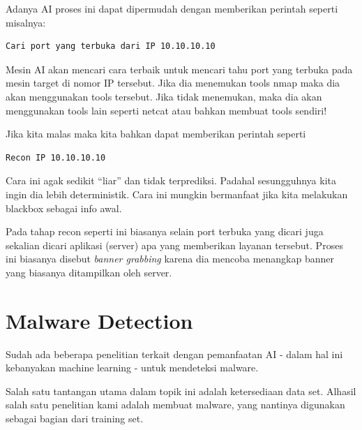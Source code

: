 Adanya AI proses ini dapat dipermudah dengan memberikan perintah
seperti misalnya:
\begin{verbatim}
Cari port yang terbuka dari IP 10.10.10.10
\end{verbatim}
Mesin AI akan mencari cara terbaik untuk mencari tahu port yang terbuka
pada mesin target di nomor IP tersebut.
Jika dia menemukan tools nmap maka dia akan menggunakan tools tersebut.
Jika tidak menemukan, maka dia akan menggunakan tools lain seperti
netcat atau bahkan membuat tools sendiri!

Jika kita malas maka kita bahkan dapat memberikan perintah seperti
\begin{verbatim}
Recon IP 10.10.10.10
\end{verbatim}
Cara ini agak sedikit ``liar'' dan tidak terprediksi.
Padahal sesungguhnya kita ingin dia lebih deterministik.
Cara ini mungkin bermanfaat jika kita melakukan blackbox
sebagai info awal.

Pada tahap recon seperti ini biasanya selain port terbuka yang dicari
juga sekalian dicari aplikasi (server) apa yang memberikan layanan tersebut.
Proses ini biasanya disebut \emph{banner grabbing} karena dia mencoba
menangkap banner yang biasanya ditampilkan oleh server.

\section{Malware Detection}
Sudah ada beberapa penelitian terkait dengan pemanfaatan AI - dalam hal ini
kebanyakan machine learning - untuk mendeteksi malware.

Salah satu tantangan utama dalam topik ini adalah ketersediaan data set.
Alhasil salah satu penelitian kami adalah membuat malware, yang nantinya
digunakan sebagai bagian dari training set.
